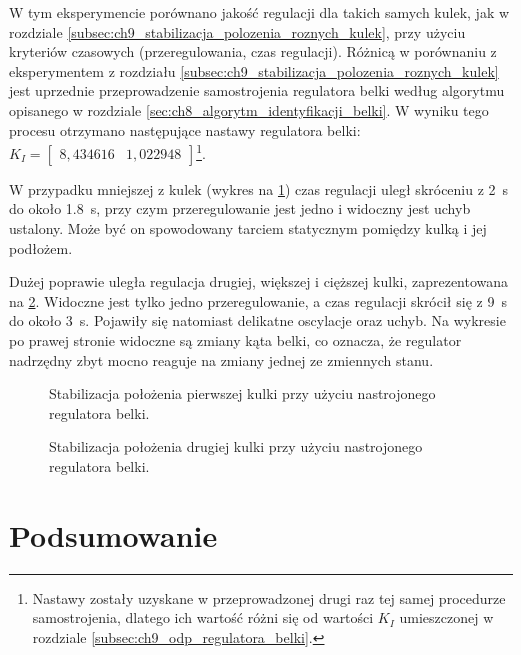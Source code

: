 W tym eksperymencie porównano jakość regulacji dla takich samych kulek, jak w rozdziale \ref{subsec:ch9_stabilizacja_polozenia_roznych_kulek}, przy użyciu kryteriów czasowych (przeregulowania, czas regulacji). Różnicą w porównaniu z eksperymentem z rozdziału \ref{subsec:ch9_stabilizacja_polozenia_roznych_kulek} jest uprzednie przeprowadzenie samostrojenia regulatora belki według algorytmu opisanego w rozdziale \ref{sec:ch8_algorytm_identyfikacji_belki}. W wyniku tego procesu otrzymano następujące nastawy regulatora belki: $K_I = \begin{bmatrix}
8,434616 & 1,022948
\end{bmatrix}$\footnote{Nastawy zostały uzyskane w przeprowadzonej drugi raz tej samej procedurze samostrojenia, dlatego ich wartość różni się od wartości $K_I$ umieszczonej w rozdziale \ref{subsec:ch9_odp_regulatora_belki}.}.

W przypadku mniejszej z kulek (wykres na \cref{fig:stabilizacja_kulka1_nastrojona}) czas regulacji uległ skróceniu z \SI{2}{\second} do około \SI{1.8}{\second}, przy czym przeregulowanie jest jedno i widoczny jest uchyb ustalony. Może być on spowodowany tarciem statycznym pomiędzy kulką i jej podłożem.

Dużej poprawie uległa regulacja drugiej, większej i cięższej kulki, zaprezentowana na \cref{fig:stabilizacja_kulka2_nastrojona}. Widoczne jest tylko jedno przeregulowanie, a czas regulacji skrócił się z \SI{9}{\second} do około \SI{3}{\second}. Pojawiły się natomiast delikatne oscylacje oraz uchyb. Na wykresie po prawej stronie widoczne są zmiany kąta belki, co oznacza, że regulator nadrzędny zbyt mocno reaguje na zmiany jednej ze zmiennych stanu.

\begin{figure}[p]
    
    \caption{Stabilizacja położenia pierwszej kulki przy użyciu nastrojonego regulatora belki.}
    \label{fig:stabilizacja_kulka1_nastrojona}
\end{figure}
\begin{figure}[p]
    
    \caption{Stabilizacja położenia drugiej kulki przy użyciu nastrojonego regulatora belki.}
    \label{fig:stabilizacja_kulka2_nastrojona}
\end{figure}

\section{Podsumowanie}

